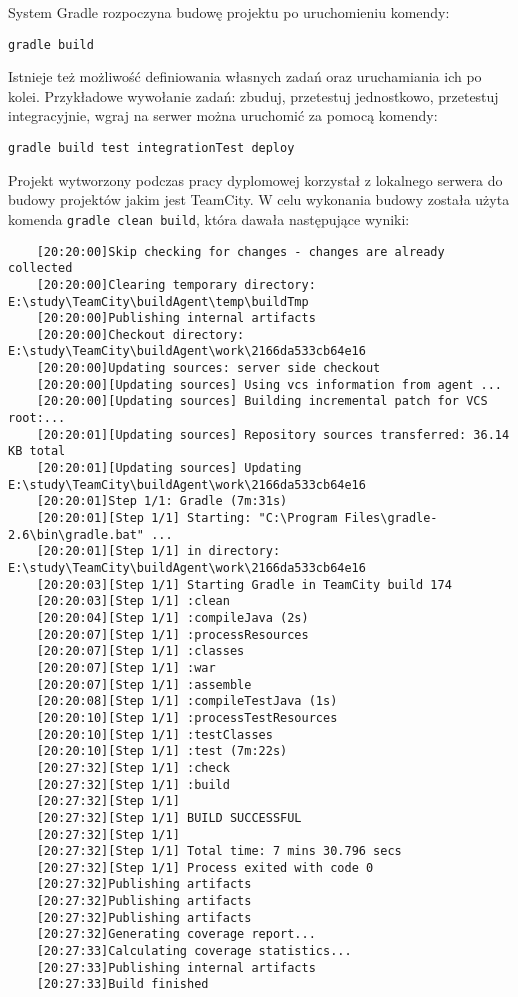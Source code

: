 System Gradle rozpoczyna budowę projektu po uruchomieniu komendy:

\verb|gradle build|

Istnieje też możliwość definiowania własnych zadań oraz uruchamiania ich po kolei. Przykładowe wywołanie zadań: zbuduj, przetestuj jednostkowo, przetestuj integracyjnie, wgraj na serwer można uruchomić za pomocą komendy:


\verb|gradle build test integrationTest deploy|

Projekt wytworzony podczas pracy dyplomowej korzystał z lokalnego serwera do budowy projektów jakim jest TeamCity. W celu wykonania budowy została użyta komenda \verb|gradle clean build|, która dawała następujące wyniki:

\begin{verbatim}
	[20:20:00]Skip checking for changes - changes are already collected
	[20:20:00]Clearing temporary directory: E:\study\TeamCity\buildAgent\temp\buildTmp
	[20:20:00]Publishing internal artifacts
	[20:20:00]Checkout directory: E:\study\TeamCity\buildAgent\work\2166da533cb64e16
	[20:20:00]Updating sources: server side checkout
	[20:20:00][Updating sources] Using vcs information from agent ...
	[20:20:00][Updating sources] Building incremental patch for VCS root:...
	[20:20:01][Updating sources] Repository sources transferred: 36.14 KB total
	[20:20:01][Updating sources] Updating E:\study\TeamCity\buildAgent\work\2166da533cb64e16
	[20:20:01]Step 1/1: Gradle (7m:31s)
	[20:20:01][Step 1/1] Starting: "C:\Program Files\gradle-2.6\bin\gradle.bat" ...
	[20:20:01][Step 1/1] in directory: E:\study\TeamCity\buildAgent\work\2166da533cb64e16
	[20:20:03][Step 1/1] Starting Gradle in TeamCity build 174
	[20:20:03][Step 1/1] :clean
	[20:20:04][Step 1/1] :compileJava (2s)
	[20:20:07][Step 1/1] :processResources
	[20:20:07][Step 1/1] :classes
	[20:20:07][Step 1/1] :war
	[20:20:07][Step 1/1] :assemble
	[20:20:08][Step 1/1] :compileTestJava (1s)
	[20:20:10][Step 1/1] :processTestResources
	[20:20:10][Step 1/1] :testClasses
	[20:20:10][Step 1/1] :test (7m:22s)
	[20:27:32][Step 1/1] :check
	[20:27:32][Step 1/1] :build
	[20:27:32][Step 1/1] 
	[20:27:32][Step 1/1] BUILD SUCCESSFUL
	[20:27:32][Step 1/1] 
	[20:27:32][Step 1/1] Total time: 7 mins 30.796 secs
	[20:27:32][Step 1/1] Process exited with code 0
	[20:27:32]Publishing artifacts
	[20:27:32]Publishing artifacts
	[20:27:32]Publishing artifacts
	[20:27:32]Generating coverage report...
	[20:27:33]Calculating coverage statistics...
	[20:27:33]Publishing internal artifacts
	[20:27:33]Build finished
\end{verbatim}

